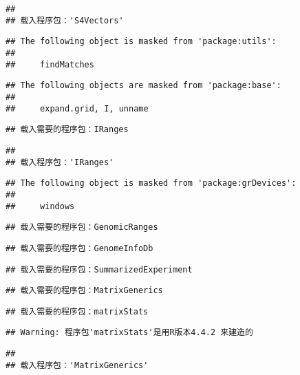 \documentclass[
]{article}
\begin{document}
\begin{verbatim}
## 
## 载入程序包：'S4Vectors'
\end{verbatim}

\begin{verbatim}
## The following object is masked from 'package:utils':
## 
##     findMatches
\end{verbatim}

\begin{verbatim}
## The following objects are masked from 'package:base':
## 
##     expand.grid, I, unname
\end{verbatim}

\begin{verbatim}
## 载入需要的程序包：IRanges
\end{verbatim}

\begin{verbatim}
## 
## 载入程序包：'IRanges'
\end{verbatim}

\begin{verbatim}
## The following object is masked from 'package:grDevices':
## 
##     windows
\end{verbatim}

\begin{verbatim}
## 载入需要的程序包：GenomicRanges
\end{verbatim}

\begin{verbatim}
## 载入需要的程序包：GenomeInfoDb
\end{verbatim}

\begin{verbatim}
## 载入需要的程序包：SummarizedExperiment
\end{verbatim}

\begin{verbatim}
## 载入需要的程序包：MatrixGenerics
\end{verbatim}

\begin{verbatim}
## 载入需要的程序包：matrixStats
\end{verbatim}

\begin{verbatim}
## Warning: 程序包'matrixStats'是用R版本4.4.2 来建造的
\end{verbatim}

\begin{verbatim}
## 
## 载入程序包：'MatrixGenerics'
\end{verbatim}
\end{document}
